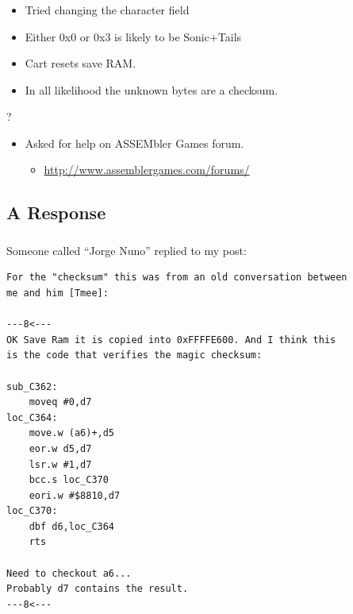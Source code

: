 \documentclass{beamer}
\begin{document}

\begin{frame}[fragile]
\frametitle{\insertsubsection}

\begin{itemize}
\item Tried changing the character field
\item Either 0x0 or 0x3 is likely to be Sonic+Tails
\item Cart resets save RAM.
\item In all likelihood the unknown bytes are a checksum.
\end{itemize}

\vfill

\begin{center}
{\Huge ?}
\end{center}

\pause

\vfill

\begin{itemize}
\item Asked for help on ASSEMbler Games forum.
\begin{itemize}
\item \url{http://www.assemblergames.com/forums/}
\end{itemize}
\end{itemize}

\vfill

\end{frame}


\subsection{A Response}

\begin{frame}[fragile]
\frametitle{\insertsubsection}

Someone called ``Jorge Nuno'' replied to my post:
\vfill


\begin{lstlisting}[basicstyle={\tt\scriptsize}]
For the "checksum" this was from an old conversation between
me and him [Tmee]:

---8<---
OK Save Ram it is copied into 0xFFFFE600. And I think this
is the code that verifies the magic checksum:

sub_C362:
    moveq #0,d7
loc_C364:
    move.w (a6)+,d5
    eor.w d5,d7
    lsr.w #1,d7
    bcc.s loc_C370
    eori.w #$8810,d7
loc_C370:
    dbf d6,loc_C364
    rts

Need to checkout a6...
Probably d7 contains the result. 
---8<---
\end{lstlisting}

\end{frame}
\end{document}
